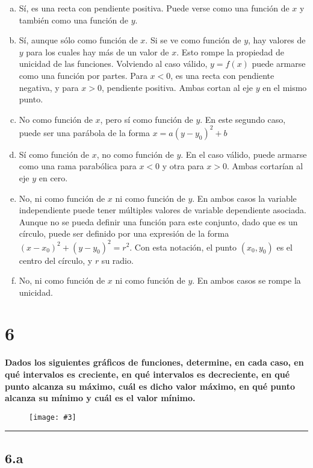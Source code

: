 \documentclass{article}
\newcommand{\figurex}[4]{\begin{figure}[ht] \caption{#1} \texttt{[image: \#3]} \centering \label{#4}\end{figure}}
\newcommand{\sectionx}[1]{\section*{#1}\label{sec:#1}\addcontentsline{toc}{section}{\nameref{sec:#1}}}
\begin{document}
\begin{enumerate}[(a)]
\item Sí, es una recta con pendiente positiva. Puede verse como una función de $x$ y también como una función de $y$.

\item Sí, aunque sólo como función de $x$. Si se ve como función de $y$, hay valores de $y$ para los cuales hay más de un valor de $x$. Esto rompe la propiedad de unicidad de las funciones. Volviendo al caso válido, $y = f(x)$ puede armarse como una función por partes. Para $x < 0$, es una recta con pendiente negativa, y para $x > 0$, pendiente positiva. Ambas cortan al eje $y$ en el mismo punto.

\item No como función de $x$, pero sí como función de $y$. En este segundo caso, puede ser una parábola de la forma $x = a (y-y_0)^2 + b$

\item Sí como función de $x$, no como función de $y$. En el caso válido, puede armarse como una rama parabólica para $x < 0$ y otra para $x > 0$. Ambas cortarían al eje $y$ en cero.

\item No, ni como función de $x$ ni como función de $y$. En ambos casos la variable independiente puede tener múltiples valores de variable dependiente asociada. Aunque no se pueda definir una función para este conjunto, dado que es un círculo, puede ser definido por una expresión de la forma $ (x-x_0)^2 + (y-y_0)^2 = r^2$. Con esta notación, el punto $(x_0, y_0)$ es el centro del círculo, y $r$ su radio.

\item No, ni como función de $x$ ni como función de $y$. En ambos casos se rompe la unicidad.

\end{enumerate}

\sectionx{6}

\textbf{Dados los siguientes gráficos de funciones, determine, en cada caso, en qué intervalos es creciente, en qué intervalos es decreciente, en qué punto alcanza su máximo, cuál es dicho valor máximo, en qué punto alcanza su mínimo y cuál es el valor mínimo.}

\figurex{}{3}{../img/guide_01/ex_06.png}{fig:6}

\hrule

\subsection*{6.a}
\label{subsec:6.a}
\end{document}

